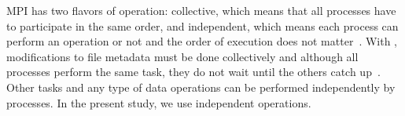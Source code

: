 MPI has two flavors of operation: collective, which means that all processes have to participate in the same order, and independent, which means each process can perform an operation or not and the order of execution does not matter~\cite{pythonhdf5}.
With , modifications to file metadata must be done collectively and although all processes perform the same task, they do not wait until the others catch up~\cite{pythonhdf5}. 
Other tasks and any type of data operations can be performed independently by processes.
In the present study, we use independent operations.
